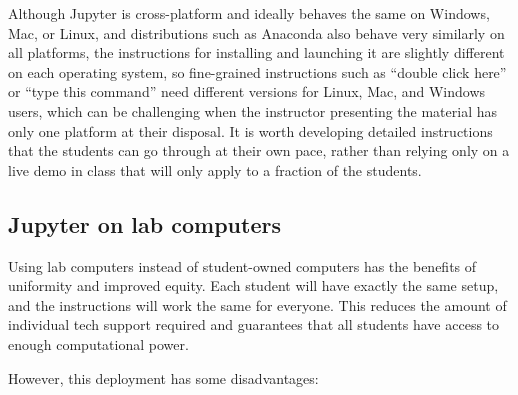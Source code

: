 \documentclass[]{book}
\begin{document}
Although Jupyter is cross-platform and ideally behaves the same on
Windows, Mac, or Linux, and distributions such as Anaconda also behave
very similarly on all platforms, the instructions for installing and
launching it are slightly different on each operating system, so
fine-grained instructions such as ``double click here'' or ``type this
command'' need different versions for Linux, Mac, and Windows users,
which can be challenging when the instructor presenting the material has
only one platform at their disposal. It is worth developing detailed
instructions that the students can go through at their own pace, rather
than relying only on a live demo in class that will only apply to a
fraction of the students.

\subsection{Jupyter on lab computers}\label{jupyter-on-lab-computers}

Using lab computers instead of student-owned computers has the benefits
of uniformity and improved equity. Each student will have exactly the
same setup, and the instructions will work the same for everyone. This
reduces the amount of individual tech support required and guarantees
that all students have access to enough computational power.

However, this deployment has some disadvantages:
\end{document}
